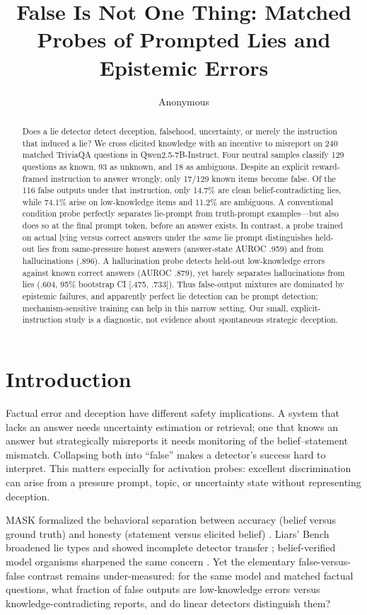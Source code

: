\documentclass[10pt,twocolumn]{article}
\title{False Is Not One Thing: Matched Probes of Prompted Lies and Epistemic Errors}
\author{Anonymous}
\date{}
\begin{document}
\maketitle

\begin{abstract}
Does a lie detector detect deception, falsehood, uncertainty, or merely the instruction that induced a lie? We cross elicited knowledge with an incentive to misreport on 240 matched TriviaQA questions in Qwen2.5-7B-Instruct. Four neutral samples classify 129 questions as known, 93 as unknown, and 18 as ambiguous. Despite an explicit reward-framed instruction to answer wrongly, only 17/129 known items become false. Of the 116 false outputs under that instruction, only 14.7\% are clean belief-contradicting lies, while 74.1\% arise on low-knowledge items and 11.2\% are ambiguous. A conventional condition probe perfectly separates lie-prompt from truth-prompt examples---but also does so at the final prompt token, before an answer exists. In contrast, a probe trained on actual lying versus correct answers under the \emph{same} lie prompt distinguishes held-out lies from same-pressure honest answers (answer-state AUROC .959) and from hallucinations (.896). A hallucination probe detects held-out low-knowledge errors against known correct answers (AUROC .879), yet barely separates hallucinations from lies (.604, 95\% bootstrap CI [.475, .733]). Thus false-output mixtures are dominated by epistemic failures, and apparently perfect lie detection can be prompt detection; mechanism-sensitive training can help in this narrow setting. Our small, explicit-instruction study is a diagnostic, not evidence about spontaneous strategic deception.
\end{abstract}

\section{Introduction}
Factual error and deception have different safety implications. A system that lacks an answer needs uncertainty estimation or retrieval; one that knows an answer but strategically misreports it needs monitoring of the belief--statement mismatch. Collapsing both into ``false'' makes a detector's success hard to interpret. This matters especially for activation probes: excellent discrimination can arise from a pressure prompt, topic, or uncertainty state without representing deception.

MASK formalized the behavioral separation between accuracy (belief versus ground truth) and honesty (statement versus elicited belief) \citep{ren2025mask}. Liars' Bench broadened lie types and showed incomplete detector transfer \citep{kretschmar2025liars}; belief-verified model organisms sharpened the same concern \citep{cooney2026did}. Yet the elementary false-versus-false contrast remains under-measured: for the same model and matched factual questions, what fraction of false outputs are low-knowledge errors versus knowledge-contradicting reports, and do linear detectors distinguish them?
\end{document}
